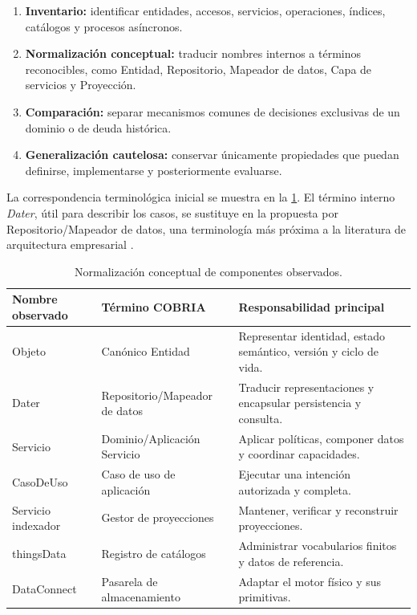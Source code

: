 \begin{enumerate}[leftmargin=*]
  \item \textbf{Inventario:} identificar entidades, accesos, servicios, operaciones,
  índices, catálogos y procesos asíncronos.
  \item \textbf{Normalización conceptual:} traducir nombres internos a términos
  reconocibles, como Entidad, Repositorio, Mapeador de datos, Capa de servicios y Proyección.
  \item \textbf{Comparación:} separar mecanismos comunes de decisiones exclusivas de
  un dominio o de deuda histórica.
  \item \textbf{Generalización cautelosa:} conservar únicamente propiedades que puedan
  definirse, implementarse y posteriormente evaluarse.
\end{enumerate}

La correspondencia terminológica inicial se muestra en la
\cref{tab:correspondencia-componentes}. El término interno \emph{Dater}, útil para
describir los casos, se sustituye en la propuesta por Repositorio/Mapeador de datos, una
terminología más próxima a la literatura de arquitectura empresarial
\parencite{fowler2002poeaa}.

\begin{table}[H]
\centering
\caption{Normalización conceptual de componentes observados.}
\label{tab:correspondencia-componentes}
\begin{tabularx}{\textwidth}{p{3.2cm}p{4.2cm}X}
\toprule
Nombre observado & Término COBRIA & Responsabilidad principal \\
\midrule
Objeto & Canónico Entidad & Representar identidad, estado semántico, versión y ciclo de vida.\\
Dater & Repositorio/Mapeador de datos & Traducir representaciones y encapsular persistencia y consulta.\\
Servicio & Dominio/Aplicación Servicio & Aplicar políticas, componer datos y coordinar capacidades.\\
CasoDeUso & Caso de uso de aplicación & Ejecutar una intención autorizada y completa.\\
Servicio indexador & Gestor de proyecciones & Mantener, verificar y reconstruir proyecciones.\\
thingsData & Registro de catálogos & Administrar vocabularios finitos y datos de referencia.\\
DataConnect & Pasarela de almacenamiento & Adaptar el motor físico y sus primitivas.\\
\bottomrule
\end{tabularx}
\end{table}


